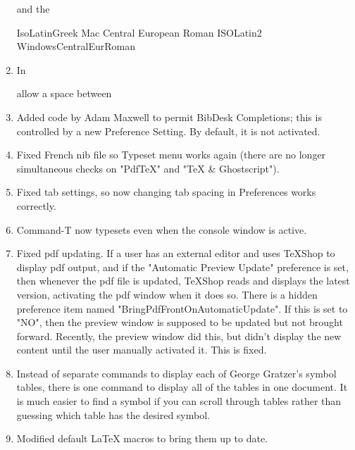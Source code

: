 \documentclass[11pt, oneside]{amsart}
\begin{document}
\begin{enumerate}
	and the %

		IsoLatinGreek
		Mac Central European Roman
		ISOLatin2
		WindowsCentralEurRoman

\item In


allow a space between %


\item Added code by Adam Maxwell to permit BibDesk Completions; this is controlled by a new Preference Setting. By default, it is not activated.


\item Fixed French nib file so Typeset menu works again (there are no longer simultaneous checks on "PdfTeX" and "TeX \& Ghostscript").


\item Fixed tab settings, so now changing tab spacing in Preferences works correctly.


\item Command-T now typesets even when the console window is active.


\item Fixed pdf updating. If a user has an external editor and uses TeXShop to display pdf output, and if the "Automatic Preview Update" preference is set, then whenever the pdf file is updated, TeXShop reads and displays the latest version, activating the pdf window when it does so. There is a hidden preference item named "BringPdfFrontOnAutomaticUpdate". If this is set to "NO", then the preview window is supposed to be updated but not brought forward. Recently, the preview window did this, but didn't display the new content until the user manually activated it. This is fixed.

\item Instead of separate commands to display each of George Gratzer's symbol tables, there is one command to display all of the tables in one document. It is much easier to find a symbol if you can scroll through tables rather than guessing which table has the desired symbol.

\item Modified default LaTeX macros to bring them up to date.

 \end{enumerate}
\end{document}
